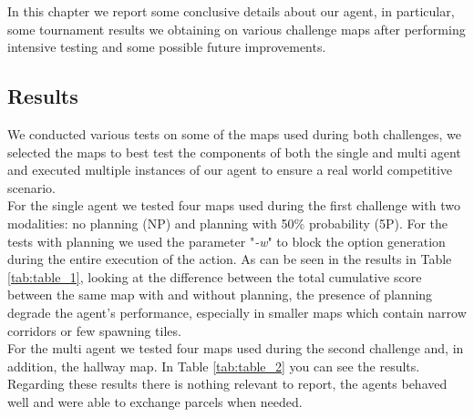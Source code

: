     In this chapter we report some conclusive details about our agent, in particular, some tournament results we obtaining on various challenge maps after performing intensive testing and some possible future improvements.

    \subsection{Results}
        We conducted various tests on some of the maps used during both challenges, we selected the maps to best test the components of both the single and multi agent and executed multiple instances of our agent to ensure a real world competitive scenario.
        \medskip\\
        For the single agent we tested four maps used during the first challenge with two modalities: no planning (NP) and planning with 50\% probability (5P). For the tests with planning we used the parameter "\textit{-w}" to block the option generation during the entire execution of the action. As can be seen in the results in Table \ref{tab:table_1}, looking at the difference between the total cumulative score between the same map with and without planning, the presence of planning degrade the agent's performance, especially in smaller maps which contain narrow corridors or few spawning tiles.
        \medskip\\
        For the multi agent we tested four maps used during the second challenge and, in addition, the hallway map. In Table \ref{tab:table_2} you can see the results. Regarding these results there is nothing relevant to report, the agents behaved well and were able to exchange parcels when needed.
    

